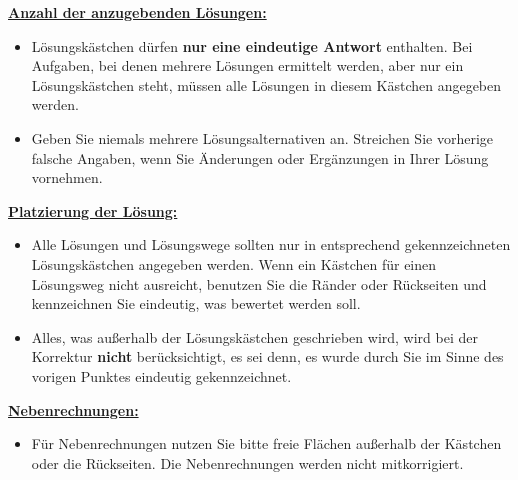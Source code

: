 \documentclass[12pt,a4paper]{article}
\newcommand{\sq}{\raisebox{1.5pt}{\tiny$\blacksquare$}}
\begin{document}
{\noindent\underline{\textbf{Anzahl der anzugebenden Lösungen:}}
\begin{itemize}[label=\sq,itemsep=2pt,topsep=2pt]
\item Lösungskästchen dürfen \textbf{nur eine eindeutige Antwort} enthalten. Bei Aufgaben, bei denen mehrere Lösungen ermittelt werden, aber nur ein Lösungskästchen steht, müssen alle Lösungen in diesem Kästchen angegeben werden.
\item Geben Sie niemals mehrere Lösungsalternativen an. Streichen Sie vorherige falsche Angaben, wenn Sie Änderungen oder Ergänzungen in Ihrer Lösung vornehmen.
\end{itemize}
\noindent\underline{\textbf{Platzierung der Lösung:}}
\begin{itemize}[label=\sq,itemsep=2pt,topsep=2pt]
\item Alle Lösungen und Lösungswege sollten nur in entsprechend gekennzeichneten Lösungskästchen angegeben werden. Wenn ein Kästchen für einen Lösungsweg nicht ausreicht, benutzen Sie die Ränder oder Rückseiten und kennzeichnen Sie eindeutig, was bewertet werden soll.
\item Alles, was außerhalb der Lösungskästchen geschrieben wird, wird bei der Korrektur \textbf{nicht} berücksichtigt, es sei denn, es wurde durch Sie im Sinne des vorigen Punktes eindeutig gekennzeichnet.
\end{itemize}
\noindent\underline{\textbf{Nebenrechnungen:}}
\begin{itemize}[label=\sq,itemsep=2pt,topsep=2pt]
\item Für Nebenrechnungen nutzen Sie bitte freie Flächen außerhalb der Kästchen oder die Rückseiten. Die Nebenrechnungen werden nicht mitkorrigiert.
\end{itemize}}

\newpage
\setcounter{page}{1}
\onehalfspacing
\end{document}
